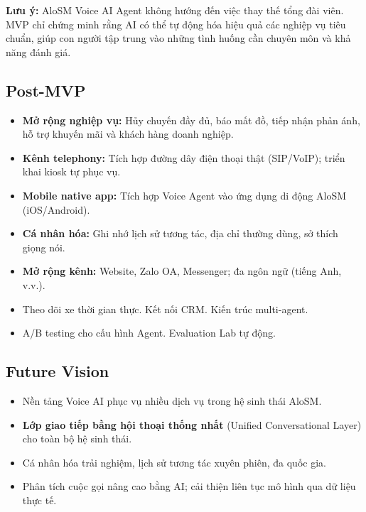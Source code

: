 \documentclass[12pt,a4paper]{article}
\begin{document}
\begin{tcolorbox}[notebox]
  \textbf{Lưu ý:} AloSM Voice AI Agent không hướng đến việc thay thế tổng đài viên. MVP chỉ chứng minh rằng AI có thể tự động hóa hiệu quả các nghiệp vụ tiêu chuẩn, giúp con người tập trung vào những tình huống cần chuyên môn và khả năng đánh giá.
\end{tcolorbox}

\subsection{Post-MVP}
\begin{itemize}
  \item \textbf{Mở rộng nghiệp vụ:} Hủy chuyến đầy đủ, báo mất đồ, tiếp nhận phản ánh, hỗ trợ khuyến mãi và khách hàng doanh nghiệp.
  \item \textbf{Kênh telephony:} Tích hợp đường dây điện thoại thật (SIP/VoIP); triển khai kiosk tự phục vụ.
  \item \textbf{Mobile native app:} Tích hợp Voice Agent vào ứng dụng di động AloSM (iOS/Android).
  \item \textbf{Cá nhân hóa:} Ghi nhớ lịch sử tương tác, địa chỉ thường dùng, sở thích giọng nói.
  \item \textbf{Mở rộng kênh:} Website, Zalo OA, Messenger; đa ngôn ngữ (tiếng Anh, v.v.).
  \item Theo dõi xe thời gian thực. \quad Kết nối CRM. \quad Kiến trúc multi-agent.
  \item A/B testing cho cấu hình Agent. \quad Evaluation Lab tự động.
\end{itemize}

\subsection{Future Vision}
\begin{itemize}
  \item Nền tảng Voice AI phục vụ nhiều dịch vụ trong hệ sinh thái AloSM.
  \item \textbf{Lớp giao tiếp bằng hội thoại thống nhất} (Unified Conversational Layer) cho toàn bộ hệ sinh thái.
  \item Cá nhân hóa trải nghiệm, lịch sử tương tác xuyên phiên, đa quốc gia.
  \item Phân tích cuộc gọi nâng cao bằng AI; cải thiện liên tục mô hình qua dữ liệu thực tế.
\end{itemize}

\end{document}
